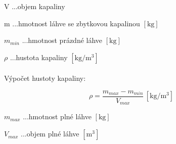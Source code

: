 V ...objem kapaliny

m ...hmotnost láhve se zbytkovou kapalinou \([\mathrm{kg}]\)

\(m_{min}\) ...hmotnost prázdné láhve \([\mathrm{kg}]\)

\(\rho\) ...hustota kapaliny \([\mathrm{kg/m^3}]\)
\\
\\
Výpočet hustoty kapaliny:

\begin{equation}
    \rho = \frac{m_{max} - m_{min}}{V_{max}} \, \left[\mathrm{kg/m^3}\right] \label{objem_kapalina}
\end{equation}


\(m_{max}\) ...hmotnost plné láhve \([\mathrm{kg}]\)

\(V_{max}\) ...objem plné láhve \([\mathrm{m^3}]\)
\bigskip

%    
%    

